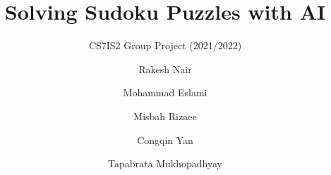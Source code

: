 \documentclass{svproc}
\begin{document}
\mainmatter
\title{Solving Sudoku Puzzles with AI}
\subtitle{CS7IS2 Group Project (2021/2022)}
\author{Rakesh Nair \and Mohammad Eslami \and Misbah Rizaee \and Congqin Yan \and Tapabrata Mukhopadhyay}

\maketitle
















\end{document}
